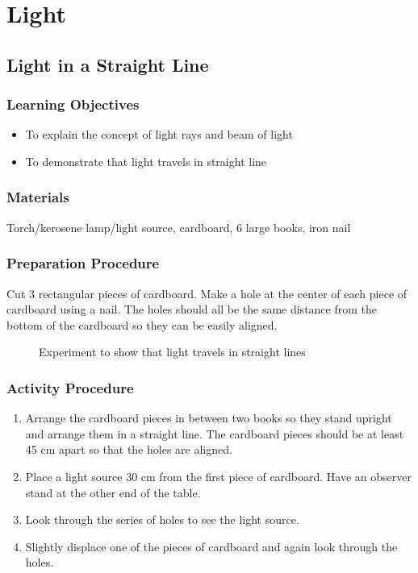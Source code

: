 \section{Light}

\subsection{Light in a Straight Line}

\subsubsection*{Learning Objectives}
\begin{itemize}
\item{To explain the concept of light rays and beam of light} 
\item{To demonstrate that light travels in straight line} 
\end{itemize}

\subsubsection*{Materials}
Torch/kerosene lamp/light source, cardboard, 6 large books, iron nail

\subsubsection*{Preparation Procedure}
Cut 3 rectangular pieces of cardboard. Make a hole at the center of each piece of cardboard using a nail. The holes should all be the same distance from the bottom of the cardboard so they can be easily aligned.

\begin{figure}[h!]
\begin{center}
\def\svgwidth{350pt}

\caption{Experiment to show that light travels in straight lines}
\label{fig:prop-of-light}
\end{center}
\end{figure}

\subsubsection*{Activity Procedure}
\begin{enumerate}
\item{Arrange the cardboard pieces in between two books so they stand upright and arrange them in a straight line. The cardboard pieces should be at least 45 cm apart so that the holes are aligned.} 
\item{Place a light source 30 cm from the first piece of cardboard. Have an observer stand at the other end of the table.} 
\item{Look through the series of holes to see the light source.}
\item{Slightly displace one of the pieces of cardboard and again look through the holes.}
\end{enumerate}

